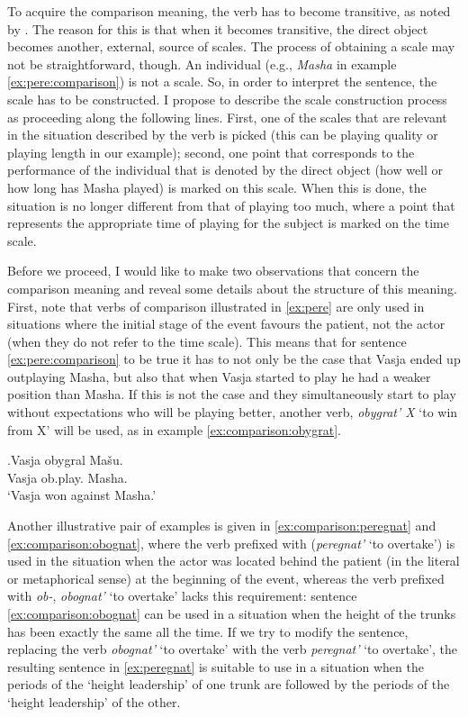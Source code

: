 To acquire the comparison meaning, the verb has to become transitive, as noted by \citet{Shvedova:82}. The reason for this is that when it becomes transitive, the direct object becomes another, external, source of scales. The process of obtaining a scale may not be straightforward, though. An individual (e.g., \textit{Masha} in example \ref{ex:pere:comparison}) is not a scale. So, in order to interpret the sentence, the scale has to be constructed. I propose to describe the scale construction process as proceeding along the following lines. First, one of the scales that are relevant in the situation described by the verb is picked (this can be playing quality or playing length in our example); second, one point that corresponds to the performance of the individual that is denoted by the direct object (how well or how long has Masha played) is marked on this scale. When this is done, the situation is no longer different from that of playing too much, where a point that represents the appropriate time of playing for the subject is marked on the time scale.

Before we proceed, I would like to make two observations that concern the comparison meaning and reveal some details about the structure of this meaning. First, note that verbs of comparison illustrated in \ref{ex:pere} are only used in situations where the initial stage of the event favours the patient, not the actor (when they do not refer to the time scale). This means that for sentence \ref{ex:pere:comparison} to be true it has to not only be the case that Vasja ended up outplaying Masha, but also that when Vasja started to play he had a weaker position than Masha. If this is not the case and they simultaneously start to play without expectations who will be playing better, another verb, \textit{obygrat' X} `to win from X' will be used, as in example \ref{ex:comparison:obygrat}. 

\exg.\label{ex:comparison:obygrat}Vasja obygral Ma\v{s}u.\\
Vasja ob.play. Masha.\\
\trans `Vasja won against Masha.'

Another illustrative pair of examples is given in \ref{ex:comparison:peregnat} and \ref{ex:comparison:obognat}, where the verb prefixed with  (\textit{peregnat'} `to overtake') is used in the situation when the actor was located behind the patient (in the literal or metaphorical sense) at the beginning of the event, whereas the verb prefixed with {\textit{ob-},} \textit{obognat'} `to overtake' lacks this requirement: sentence \ref{ex:comparison:obognat} can be used in a situation when the height of the trunks has been exactly the same all the time. If we try to modify the sentence, replacing the verb \textit{obognat'} `to overtake' with the verb \textit{peregnat'} `to overtake', the resulting sentence in \ref{ex:peregnat} is suitable to use in a situation when the periods of the `height leadership' of one trunk are followed by the periods of the `height leadership' of the other.


